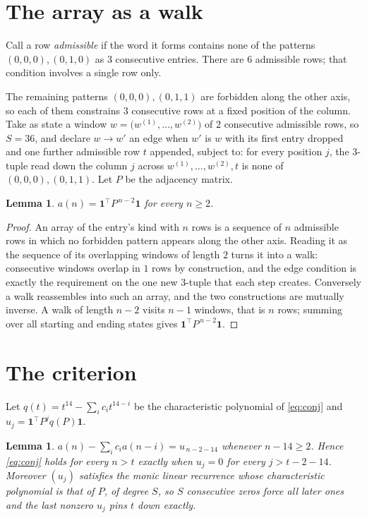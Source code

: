 \documentclass[11pt,a4paper]{article}
\theoremstyle{plain}
\newtheorem{lemma}[theorem]{Lemma}
\theoremstyle{definition}
\begin{document}
\section{The array as a walk}

Call a row \emph{admissible} if the word it forms contains none of the patterns
$(0,0,0), (0,1,0)$ as $3$ consecutive entries. There are $6$ admissible rows; that condition
involves a single row only.

The remaining patterns $(0,0,0), (0,1,1)$ are forbidden along the other axis, so each of them
constrains $3$ consecutive rows at a fixed position of the column. Take as state a
window $w=\bigl(w^{(1)},\dots,w^{(2)}\bigr)$ of $2$ consecutive admissible
rows, so $S=36$, and declare $w\to w'$ an edge when $w'$ is $w$ with its first entry
dropped and one further admissible row $t$ appended, subject to: for every position
$j$, the $3$-tuple read down the column $j$ across $w^{(1)},\dots,w^{(2)},t$
is none of $(0,0,0), (0,1,1)$. Let $P$ be the adjacency matrix.

\begin{lemma}\label{lem:walk}
$a(n)=\mathbf{1}^{\!\top}P^{\,n-2}\mathbf{1}$ for every $n\ge2$.
\end{lemma}

\begin{proof}
An array of the entry's kind with $n$ rows is a sequence of $n$ admissible rows in
which no forbidden pattern appears along the other axis. Reading it as the sequence of its
overlapping windows of length $2$ turns it into a walk: consecutive windows overlap in
$1$ rows by construction, and the edge condition is exactly the requirement on the one
new $3$-tuple that each step creates. Conversely a walk reassembles into such an array,
and the two constructions are mutually inverse. A walk of length $n-2$ visits $n-1$
windows, that is $n$ rows; summing over all starting and ending states gives
$\mathbf{1}^{\!\top}P^{\,n-2}\mathbf{1}$.
\end{proof}

\section{The criterion}

Let $q(t)=t^{14}-\sum_i c_i t^{14-i}$ be the characteristic polynomial of
\eqref{eq:conj} and $u_j=\mathbf{1}^{\!\top}P^{j}q(P)\mathbf{1}$.

\begin{lemma}\label{lem:crit}
$a(n)-\sum_i c_i a(n-i)=u_{\,n-2-14}$ whenever $n-14\ge2$. Hence
\eqref{eq:conj} holds for every $n>t$ exactly when $u_j=0$ for every
$j>t-2-14$. Moreover $(u_j)$ satisfies the monic linear recurrence whose
characteristic polynomial is that of $P$, of degree $S$, so $S$ consecutive zeros force all
later ones and the last nonzero $u_j$ pins $t$ down exactly.
\end{lemma}
\end{document}
